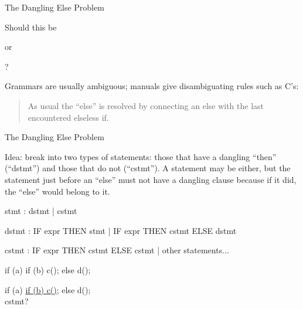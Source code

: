 \documentclass{plt}
\begin{document}
\begin{frame}{The Dangling Else Problem}

\hfil
Should this be
\hfil
{}
\hfil
or
\hfil
{}
\hfil
?

Grammars are usually ambiguous; manuals give disambiguating rules such 
as C's:

\begin{quotation}
\noindent
As usual the ``else'' is resolved by connecting
an else with the last encountered elseless if.
\end{quotation}


\end{frame}


\begin{frame}[fragile]{The Dangling Else Problem}

Idea: break into two types of statements: those that have a dangling
``then'' (``dstmt'') and those that do not (``cstmt'').  A statement may be
either, but the statement just before an ``else'' must not have a
dangling clause because if it did, the ``else'' would belong to it.

\begin{ocamlyacc}
stmt : dstmt
     | cstmt

dstmt : IF expr THEN stmt
      | IF expr THEN cstmt ELSE dstmt

cstmt : IF expr THEN cstmt ELSE cstmt
      | other statements...
\end{ocamlyacc}

\begin{overprint}
\begin{center}\ttfamily
if (a) if (b) c(); else d();
\end{center}
\begin{center}\ttfamily
\alert{if} (a) \underline{if (b) c();} \alert{else} d(); \\
cstmt?
\end{center}
\end{overprint}
\end{frame}
\end{document}
